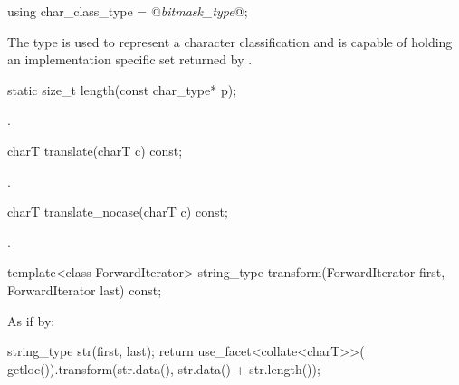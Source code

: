 %
\begin{itemdecl}
using char_class_type = @\textit{bitmask_type}@;
\end{itemdecl}

\begin{itemdescr}
\pnum
The type  is used to represent a character
classification and is capable of holding an implementation specific
set returned by .
\end{itemdescr}

%
\begin{itemdecl}
static size_t length(const char_type* p);
\end{itemdecl}

\begin{itemdescr}
\pnum
\returns
{}.
\end{itemdescr}

%
\begin{itemdecl}
charT translate(charT c) const;
\end{itemdecl}

\begin{itemdescr}
\pnum
\returns
{}.
\end{itemdescr}

%
\begin{itemdecl}
charT translate_nocase(charT c) const;
\end{itemdecl}

\begin{itemdescr}
\pnum
\returns
{}.
\end{itemdescr}

%
\begin{itemdecl}
template<class ForwardIterator>
  string_type transform(ForwardIterator first, ForwardIterator last) const;
\end{itemdecl}

\begin{itemdescr}
\pnum
\effects
As if by:
\begin{codeblock}
string_type str(first, last);
return use_facet<collate<charT>>(
  getloc()).transform(str.data(), str.data() + str.length());
\end{codeblock}
\end{itemdescr}

